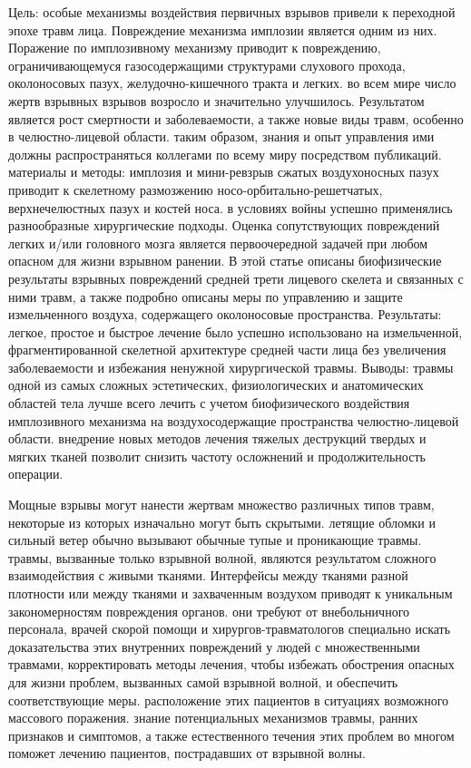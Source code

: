 Цель: особые механизмы воздействия первичных взрывов привели к переходной эпохе
травм лица. Повреждение механизма имплозии является одним из них. Поражение по
имплозивному механизму приводит к повреждению, ограничивающемуся газосодержащими
структурами слухового прохода, околоносовых пазух, желудочно-кишечного тракта и
легких. во всем мире число жертв взрывных взрывов возросло и значительно
улучшилось. Результатом является рост смертности и заболеваемости, а также новые
виды травм, особенно в челюстно-лицевой области. таким образом, знания и опыт
управления ими должны распространяться коллегами по всему миру посредством
публикаций. материалы и методы: имплозия и мини-ревзрыв сжатых воздухоносных
пазух приводит к скелетному размозжению носо-орбитально-решетчатых,
верхнечелюстных пазух и костей носа. в условиях войны успешно применялись
разнообразные хирургические подходы. Оценка сопутствующих повреждений легких
и/или головного мозга является первоочередной задачей при любом опасном для
жизни взрывном ранении. В этой статье описаны биофизические результаты взрывных
повреждений средней трети лицевого скелета и связанных с ними травм, а также
подробно описаны меры по управлению и защите измельченного воздуха, содержащего
околоносовые пространства. Результаты: легкое, простое и быстрое лечение было
успешно использовано на измельченной, фрагментированной скелетной архитектуре
средней части лица без увеличения заболеваемости и избежания ненужной
хирургической травмы. Выводы: травмы одной из самых сложных эстетических,
физиологических и анатомических областей тела лучше всего лечить с учетом
биофизического воздействия имплозивного механизма на воздухосодержащие
пространства челюстно-лицевой области. внедрение новых методов лечения тяжелых
деструкций твердых и мягких тканей позволит снизить частоту осложнений и
продолжительность операции.\cite{shuker2010}

Мощные взрывы могут нанести жертвам множество различных типов травм, некоторые
из которых изначально могут быть скрытыми. летящие обломки и сильный ветер
обычно вызывают обычные тупые и проникающие травмы. травмы, вызванные только
взрывной волной, являются результатом сложного взаимодействия с живыми тканями.
Интерфейсы между тканями разной плотности или между тканями и захваченным
воздухом приводят к уникальным закономерностям повреждения органов. они требуют
от внебольничного персонала, врачей скорой помощи и хирургов-травматологов
специально искать доказательства этих внутренних повреждений у людей с
множественными травмами, корректировать методы лечения, чтобы избежать
обострения опасных для жизни проблем, вызванных самой взрывной волной, и
обеспечить соответствующие меры. расположение этих пациентов в ситуациях
возможного массового поражения. знание потенциальных механизмов травмы, ранних
признаков и симптомов, а также естественного течения этих проблем во многом
поможет лечению пациентов, пострадавших от взрывной волны.\cite{wightman2001}

